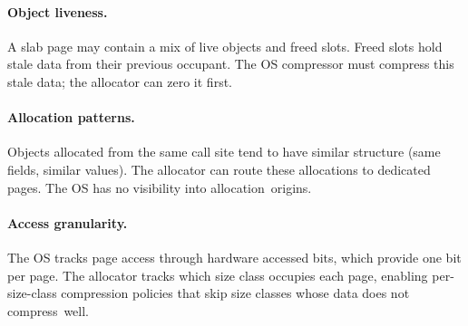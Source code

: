 \paragraph{Object liveness.}  A slab page may contain a mix of live
objects and freed slots.  Freed slots hold stale data from their
previous occupant.  The OS compressor must compress this stale data;
the allocator can zero it first.

\paragraph{Allocation patterns.}  Objects allocated from the same
call site tend to have similar structure (same fields, similar
values).  The allocator can route these allocations to dedicated
pages.  The OS has no visibility into allocation~origins.

\paragraph{Access granularity.}  The OS tracks page access through
hardware accessed bits, which provide one bit per page.  The
allocator tracks which size class occupies each page, enabling
per-size-class compression policies that skip size classes whose data
does not compress~well.

